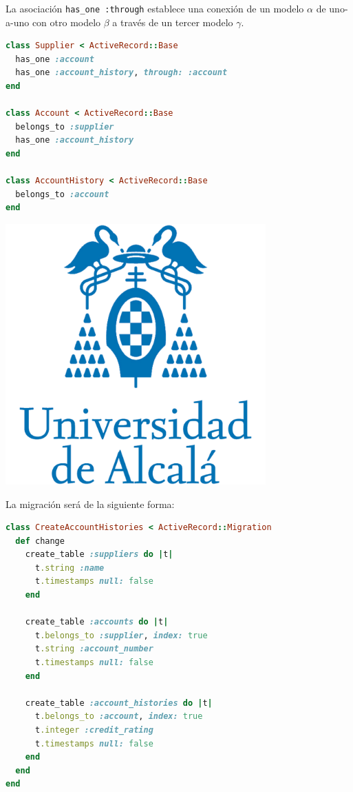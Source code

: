 La asociación \texttt{has\_one :through} establece una conexión de un modelo $\alpha$ de uno-a-uno con otro modelo $\beta$ a través de un tercer modelo $\gamma$.

\begin{lstlisting}[language=Ruby]
class Supplier < ActiveRecord::Base
  has_one :account
  has_one :account_history, through: :account
end
 
class Account < ActiveRecord::Base
  belongs_to :supplier
  has_one :account_history
end
 
class AccountHistory < ActiveRecord::Base
  belongs_to :account
end
\end{lstlisting}

\includegraphics[width=10cm]{./image/logos/uahlogo3.png}

La migración será de la siguiente forma:

\begin{lstlisting}[language=Ruby]
class CreateAccountHistories < ActiveRecord::Migration
  def change
    create_table :suppliers do |t|
      t.string :name
      t.timestamps null: false
    end
 
    create_table :accounts do |t|
      t.belongs_to :supplier, index: true
      t.string :account_number
      t.timestamps null: false
    end
 
    create_table :account_histories do |t|
      t.belongs_to :account, index: true
      t.integer :credit_rating
      t.timestamps null: false
    end
  end
end
\end{lstlisting}


